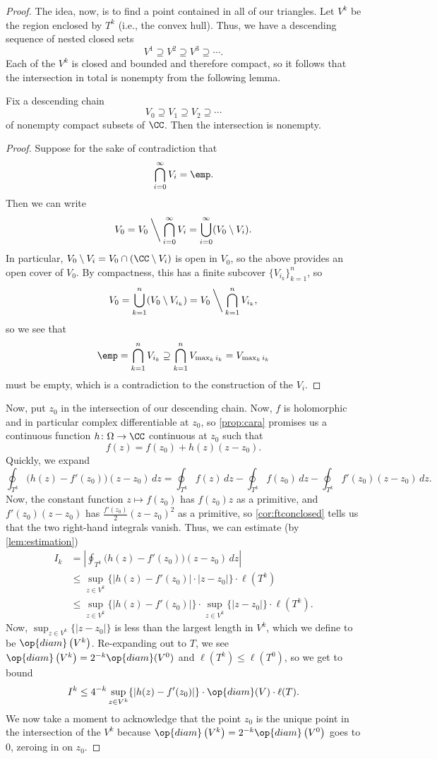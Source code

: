 \begin{proof}
	The idea, now, is to find a point contained in all of our triangles. Let $V^k$ be the region enclosed by $T^k$ (i.e., the convex hull). Thus, we have a descending sequence of nested closed sets
	\[V^1\supseteq V^2\supseteq V^3\supseteq\cdots.\]
	Each of the $V^k$ is closed and bounded and therefore compact, so it follows that the intersection in total is nonempty from the following lemma.
	\begin{lemma}
		Fix a descending chain
		\[V_0\supseteq V_1\supseteq V_2\supseteq\cdots\]
		of nonempty compact subsets of $\CC$. Then the intersection is nonempty.
	\end{lemma}
	\begin{proof}
		Suppose for the sake of contradiction that
		\[\bigcap_{i=0}^\infty V_i=\emp.\]
		Then we can write
		\[V_0=V_0\mathbin{\bigg\backslash}\bigcap_{i=0}^\infty V_i=\bigcup_{i=0}^\infty(V_0\setminus V_i).\]
		In particular, $V_0\setminus V_i=V_0\cap(\CC\setminus V_i)$ is open in $V_0$, so the above provides an open cover of $V_0$. By compactness, this has a finite subcover $\{V_{i_k}\}_{k=1}^n$, so
		\[V_0=\bigcup_{k=1}^n(V_0\setminus V_{i_k})=V_0\mathbin{\bigg\backslash}\bigcap_{k=1}^nV_{i_k},\]
		so we see that
		\[\emp=\bigcap_{k=1}^nV_{i_k}\supseteq\bigcap_{k=1}^nV_{\max_ki_k}=V_{\max_ki_k}\]
		must be empty, which is a contradiction to the construction of the $V_i$.
	\end{proof}
	Now, put $z_0$ in the intersection of our descending chain. Now, $f$ is holomorphic and in particular complex differentiable at $z_0$, so \autoref{prop:cara} promises us a continuous function $h\colon \Omega\to\CC$ continuous at $z_0$ such that
	\[f(z)=f(z_0)+h(z)(z-z_0).\]
	Quickly, we expand
	\[\oint_{T^k}\big(h(z)-f'(z_0)\big)(z-z_0)\,dz=\oint_{T^k}f(z)\,dz-\oint_{T^k}f(z_0)\,dz-\oint_{T^k}f'(z_0)(z-z_0)\,dz.\]
	Now, the constant function $z\mapsto f(z_0)$ has $f(z_0)z$ as a primitive, and $f'(z_0)(z-z_0)$ has $\frac{f'(z_0)}2(z-z_0)^2$ as a primitive, so \autoref{cor:ftconclosed} tells us that the two right-hand integrals vanish. Thus, we can estimate (by \autoref{lem:estimation})
	\begin{align*}
		I_k &= \left|\oint_{T^k}\big(h(z)-f'(z_0)\big)(z-z_0)\,dz\right| \\
		&\le \sup_{z\in V^k}\{|h(z)-f'(z_0)|\cdot|z-z_0|\}\cdot\ell\left(T^k\right) \\
		&\le \sup_{z\in V^k}\{|h(z)-f'(z_0)|\} \cdot\sup_{z\in V^k}\{|z-z_0|\}\cdot\ell\left(T^k\right).
	\end{align*}
	Now, $\sup_{z\in V^k}\{|z-z_0|\}$ is less than the largest length in $V^k$, which we define to be $\op{diam}\left(V^k\right)$. Re-expanding out to $T$, we see $\op{diam}\left(V^k\right)=2^{-k}\op{diam}(V^0)$ and $\ell\left(T^k\right)\le\ell(T^0)$, so we get to bound
	\[I^k\le 4^{-k}\sup_{z\in V^k}\{|h(z)-f'(z_0)|\}\cdot\op{diam}(V)\cdot\ell(T).\]
	We now take a moment to acknowledge that the point $z_0$ is the unique point in the intersection of the $V^k$ because $\op{diam}\left(V^k\right)=2^{-k}\op{diam}\left(V^0\right)$ goes to $0$, zeroing in on $z_0$.


\end{proof}
